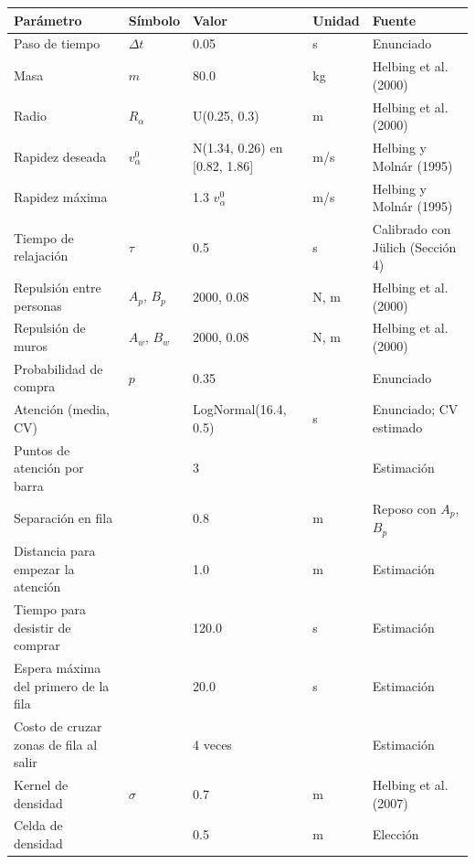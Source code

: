\begin{tabular}{llllp{4cm}}
\toprule
Parámetro & Símbolo & Valor & Unidad & Fuente \\
\midrule
Paso de tiempo & $\Delta t$ & 0.05 & s & Enunciado \\
Masa & $m$ & 80.0 & kg & Helbing et al. (2000) \\
Radio & $R_\alpha$ & U(0.25, 0.3) & m & Helbing et al. (2000) \\
Rapidez deseada & $v^0_\alpha$ & N(1.34, 0.26) en [0.82, 1.86] & m/s & Helbing y Molnár (1995) \\
Rapidez máxima &  & 1.3 $v^0_\alpha$ & m/s & Helbing y Molnár (1995) \\
Tiempo de relajación & $\tau$ & 0.5 & s & Calibrado con Jülich (Sección 4) \\
Repulsión entre personas & $A_p$, $B_p$ & 2000, 0.08 & N, m & Helbing et al. (2000) \\
Repulsión de muros & $A_w$, $B_w$ & 2000, 0.08 & N, m & Helbing et al. (2000) \\
Probabilidad de compra & $p$ & 0.35 &  & Enunciado \\
Atención (media, CV) &  & LogNormal(16.4, 0.5) & s & Enunciado; CV estimado \\
Puntos de atención por barra &  & 3 &  & Estimación \\
Separación en fila &  & 0.8 & m & Reposo con $A_p$, $B_p$ \\
Distancia para empezar la atención &  & 1.0 & m & Estimación \\
Tiempo para desistir de comprar &  & 120.0 & s & Estimación \\
Espera máxima del primero de la fila &  & 20.0 & s & Estimación \\
Costo de cruzar zonas de fila al salir &  & 4 veces &  & Estimación \\
Kernel de densidad & $\sigma$ & 0.7 & m & Helbing et al. (2007) \\
Celda de densidad &  & 0.5 & m & Elección \\
\bottomrule
\end{tabular}
